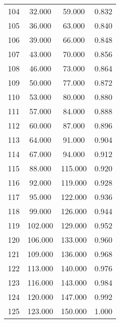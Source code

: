 \begin{tabular}{cccc}
  104 & 32.000 & 59.000 & 0.832 \\ 
  105 & 36.000 & 63.000 & 0.840 \\ 
  106 & 39.000 & 66.000 & 0.848 \\ 
  107 & 43.000 & 70.000 & 0.856 \\ 
  108 & 46.000 & 73.000 & 0.864 \\ 
  109 & 50.000 & 77.000 & 0.872 \\ 
  110 & 53.000 & 80.000 & 0.880 \\ 
  111 & 57.000 & 84.000 & 0.888 \\ 
  112 & 60.000 & 87.000 & 0.896 \\ 
  113 & 64.000 & 91.000 & 0.904 \\ 
  114 & 67.000 & 94.000 & 0.912 \\ 
  115 & 88.000 & 115.000 & 0.920 \\ 
  116 & 92.000 & 119.000 & 0.928 \\ 
  117 & 95.000 & 122.000 & 0.936 \\ 
  118 & 99.000 & 126.000 & 0.944 \\ 
  119 & 102.000 & 129.000 & 0.952 \\ 
  120 & 106.000 & 133.000 & 0.960 \\ 
  121 & 109.000 & 136.000 & 0.968 \\ 
  122 & 113.000 & 140.000 & 0.976 \\ 
  123 & 116.000 & 143.000 & 0.984 \\ 
  124 & 120.000 & 147.000 & 0.992 \\ 
  125 & 123.000 & 150.000 & 1.000 \\ 
   \hline
\end{tabular}
